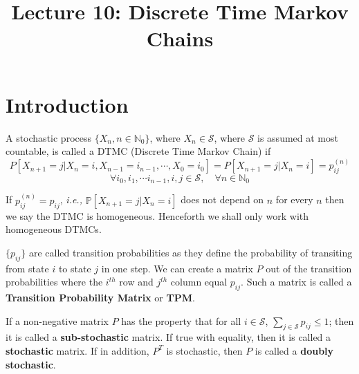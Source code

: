 \documentclass[a4paper,10pt]{article}
\title{ Lecture 10: Discrete Time Markov Chains}
\author{}
\begin{document}
\maketitle
\section{Introduction}
\begin{defn}[DTMC]
A stochastic process $\{X_n, n \in \mathbb{N}_0\}$, where $X_n \in \mathcal{S}$, where $\mathcal{S}$ is assumed at most countable, is called a DTMC (Discrete Time Markov Chain) if
\[P[X_{n+1} = j| X_n = i, X_{n-1} =i_{n-1}, \cdots, X_0 = i_0] = P[X_{n+1} = j|X_n = i] = p_{ij}^{(n)}\] 
\[\forall i_0, i_1,\cdots i_{n-1}, i,j \in \mathcal{S}, \quad \forall n \in \mathbb{N}_0\]
\end{defn}

If $p_{ij}^{(n)} = p_{ij}$, \textit{i.e.,} $\mathbb{P}[X_{n+1}=j|X_n=i]$ does not depend on $n$ for every $n$ then we say the DTMC is homogeneous. Henceforth we shall only work with homogeneous DTMCs. 

\begin{defn}
  $\{p_{ij}\}$ are called transition probabilities as they define the
  probability of transiting from state $i$ to state $j$ in one step.
  We can create a matrix $P$ out of the transition probabilities where
  the $i^{th}$ row and $j^{th}$ column equal $p_{ij}$. Such a matrix
  is called a \textbf{Transition Probability Matrix} or \textbf{TPM}.
\end{defn}
If a non-negative matrix $P$ has the property that for all $i \in \mathcal{S}$, $\sum_{j \in \mathcal{S}} p_{ij} \leq 1$; then it is called a \textbf{sub-stochastic} matrix. If true with equality, then it is called a \textbf{stochastic} matrix. If in addition, $P^T$ is stochastic, then $P$ is called a \textbf{doubly stochastic}.


\end{document}
